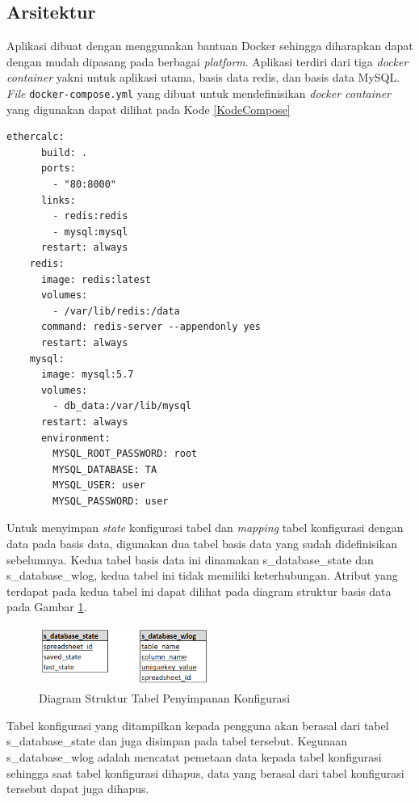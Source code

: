 	\subsection{Arsitektur}
	Aplikasi dibuat dengan menggunakan bantuan Docker sehingga diharapkan dapat dengan mudah dipasang pada berbagai \textit{platform}. Aplikasi terdiri dari tiga \textit{docker container} yakni untuk aplikasi utama, basis data redis, dan basis data MySQL. \textit{File} \texttt{docker-compose.yml} yang dibuat untuk mendefinisikan \textit{docker container} yang digunakan dapat dilihat pada Kode \ref{KodeCompose}

	\begin{lstlisting}[frame=single, basicstyle=\linespread{1}\scriptsize\listingsfont, captionpos=b, caption={Kode pada docker-compose.yml}, label=KodeCompose]
	ethercalc:
	  build: .
	  ports:
	    - "80:8000"
	  links:
	    - redis:redis
	    - mysql:mysql
	  restart: always
	redis:
	  image: redis:latest
	  volumes:
	    - /var/lib/redis:/data
	  command: redis-server --appendonly yes
	  restart: always
	mysql:
	  image: mysql:5.7
	  volumes:
	    - db_data:/var/lib/mysql
	  restart: always
	  environment:
	    MYSQL_ROOT_PASSWORD: root
	    MYSQL_DATABASE: TA
	    MYSQL_USER: user
	    MYSQL_PASSWORD: user
	\end{lstlisting}

	Untuk menyimpan \textit{state} konfigurasi tabel dan \textit{mapping} tabel konfigurasi dengan data pada basis data, digunakan dua tabel basis data yang sudah didefinisikan sebelumnya. Kedua tabel basis data ini dinamakan s\_database\_state dan s\_database\_wlog, kedua tabel ini tidak memiliki keterhubungan. Atribut yang terdapat pada kedua tabel ini dapat dilihat pada diagram struktur basis data pada Gambar \ref{StructureDiagram}.

	\begin{figure}[htb]
	    \centering
	    \includegraphics[width=0.5\textwidth]{resources/chapter-4-architect-db.png}
	    \caption{Diagram Struktur Tabel Penyimpanan Konfigurasi}
		\label{StructureDiagram}
	\end{figure}

	Tabel konfigurasi yang ditampilkan kepada pengguna akan berasal dari tabel s\_database\_state dan juga disimpan pada tabel tersebut. Kegunaan  s\_database\_wlog adalah mencatat pemetaan data kepada tabel konfigurasi sehingga saat tabel konfigurasi dihapus, data yang berasal dari tabel konfigurasi tersebut dapat juga dihapus.

